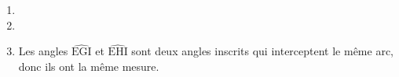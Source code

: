 
\medskip

\begin{enumerate}
\item 
\item
\item Les angles $\widehat{\text{EGI}}$ et $\widehat{\text{EHI}}$ sont deux angles inscrits qui interceptent le même arc, donc ils ont la même mesure.
\end{enumerate}

\vspace{0,5cm}

